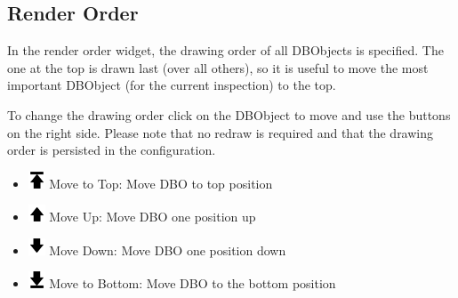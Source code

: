 \subsection{Render Order}

In the render order widget, the drawing order of all DBObjects is specified. The one at the top is drawn last (over all others), so it is useful to move the most important DBObject (for the current inspection) to the top.

To change the drawing order click on the DBObject to move and use the buttons on the right side. Please note that no redraw is required and that the drawing order is persisted in the configuration.
% 
 \begin{itemize}
 \item \includegraphics[width=0.5cm]{../../data/icons/top.png} Move to Top: Move DBO to top position
 \item \includegraphics[width=0.5cm]{../../data/icons/up.png} Move Up: Move DBO one position up
 \item \includegraphics[width=0.5cm]{../../data/icons/down.png} Move Down: Move DBO one position down
 \item \includegraphics[width=0.5cm]{../../data/icons/bottom.png} Move to Bottom: Move DBO to the bottom position
\end{itemize}
